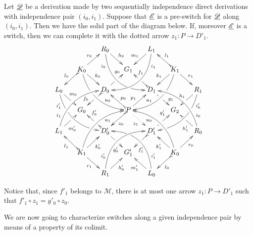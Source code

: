 \begin{remark}\label{rem:quadrati}
Let $\underline{\mathscr{D}}$ be a derivation made by two sequentially independence direct derivations with independence pair $(i_0, i_1)$. Suppose that $\underline{\mathscr{E}}$ is a pre-switch for $\underline{\mathscr{D}}$ along $(i_0, i_1)$. Then we have the solid part of the diagram below. If, moreover $\underline{\mathscr{E}}$ is a switch, then we can complete it with the dotted arrow $z_1\colon P\to D'_1$. 
		\[\xymatrix@C=15pt@R=15pt{&&R_0 \ar@/_.8cm/[ddrr]_(.2){i_0}|(.7)\hole
		\ar[dr]^{h_0}&& L_1\ar@/^.8cm/[ddll]^(.2){i_1}
		\ar[dl]_{m_1}\\&K_0\ar[dr]^{k_0}\ar@{>->}[dl]_{l_0}
		\ar@/_.6cm/[ddrr]|(.36)\hole^(.65){u_0}\ar[ur]^{r_0}&& G_1 &&
		K_1
		\ar@/^.6cm/[ddll]|(.36)\hole_(.65){u_1}\ar[dl]_{k_1}\ar@{>->}[lu]_{l_1}
		\ar[dr]^{r_1}\\L_0
		\ar@/_.6cm/[ddrr]_(.2){i'_1}|(.31)\hole|(.81)\hole
		\ar[dr]^(.4){m_0}|(.61)\hole && D_0
		\ar@{>->}[dl]|(.4)\hole_(.65){f_0}\ar[ur]|(.5)\hole^(.7){g_0}&&D_1
		\ar[dr]|(.4)\hole^(.65){g_1}
		\ar@{>->}[ul]|(.5)\hole_(.65){f_1}&&R_1\ar@/^.6cm/[ddll]^(.2){i'_0}|(.31)\hole|(.81)\hole\ar[dl]_{h_1}|(.6)\hole\\&G_0
		&&P\ar@{.>}[dr]_{z_1}	\ar@{>->}[dl]^{z_0}\ar[ur]^(.4){p_1}\ar@{>->}[ul]_(.4){p_0}&&G_2\\L_1	\ar@/^.6cm/[uurr]^(.2){i_1} \ar[ur]_(.35){m'_0}|(.61)\hole && D'_0	\ar@{>->}[ul]|(.4)\hole_(.65){f'_0}\ar[dr]|(.5)\hole_(.65){g'_0}	&&D'_1\ar[ur]|(.4)\hole^(.65){g'_1} \ar@{>->}[dl]|(.5)\hole^(.65){f'_1}	&& R_0 \ar[ul]^(.35){h'_1}|(.61)\hole\ar@/_.6cm/[uull]_(.2){i_0}\\ &K_1	\ar[ur]_{k'_0} \ar[dr]_{r_1}	\ar@{>->}[ul]^{l_1}\ar@/^.6cm/[uurr]_(.65){u_1}&&G'_1&& K_0\ar[ur]_{r_0} \ar[ul]^{k'_1} \ar@{>->}[dl]^{l_0} \ar@/_.6cm/[uull]^(.65){u_0}\\&& R_1	\ar[ur]_{h'_0}\ar@/^.8cm/[uurr]^(.2){i'_0}&& L_0 \ar[ul]^{m'_1} \ar@/_.8cm/[uull]_(.2){i'_1} |(.69)\hole }\] 
\end{remark} 

\begin{remark}\label{rem:un}
	Notice that, since $f'_1$ belongs to $\mathcal{M}$, there is at most one arrow $z_1\colon P\to D'_1$ such that $f'_{1}\circ z_1=g'_0\circ z_0$.
\end{remark}


We are now going to characterize switches along a given independence pair by means of a property of its colimit.


